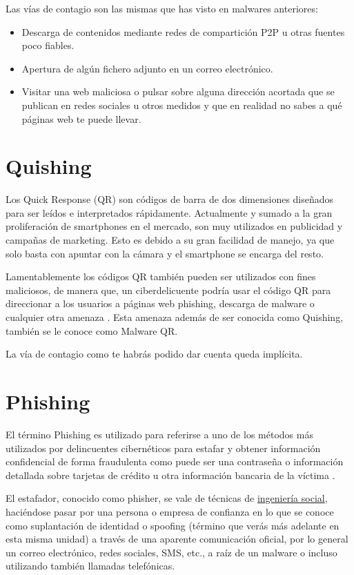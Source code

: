 \documentclass[
  spanish,
  a4paper,
  openany]{book}
\begin{document}
Las vías de contagio son las mismas que has visto en malwares anteriores:

\begin{itemize}
\item
  Descarga de contenidos mediante redes de compartición P2P u otras fuentes poco fiables.
\item
  Apertura de algún fichero adjunto en un correo electrónico.
\item
  Visitar una web maliciosa o pulsar sobre alguna dirección acortada que se publican en redes sociales u otros medidos y que en realidad no sabes a qué páginas web te puede llevar.
\end{itemize}

\hypertarget{quishing}{%
\section{Quishing}\label{quishing}}

Los Quick Response (QR) son códigos de barra de dos dimensiones diseñados para ser leídos e interpretados rápidamente. Actualmente y sumado a la gran proliferación de smartphones en el mercado, son muy utilizados en publicidad y campañas de marketing. Esto es debido a su gran facilidad de manejo, ya que solo basta con apuntar con la cámara y el smartphone se encarga del resto.

Lamentablemente los códigos QR también pueden ser utilizados con fines maliciosos, de manera que, un ciberdelicuente podría usar el código QR para direccionar a los usuarios a páginas web phishing, descarga de malware o cualquier otra amenaza \citep{ESET-malware-qr}. Esta amenaza además de ser conocida como Quishing, también se le conoce como Malware QR.

La vía de contagio como te habrás podido dar cuenta queda implícita.

\hypertarget{phishing}{%
\section{Phishing}\label{phishing}}

El término Phishing es utilizado para referirse a uno de los métodos más utilizados por delincuentes cibernéticos para estafar y obtener información confidencial de forma fraudulenta como puede ser una contraseña o información detallada sobre tarjetas de crédito u otra información bancaria de la víctima \citep{INFOSPY-phishing}.

El estafador, conocido como phisher, se vale de técnicas de \href{https://es.wikipedia.org/wiki/Ingeniería_social_(seguridad_informática)}{ingeniería social}, haciéndose pasar por una persona o empresa de confianza en lo que se conoce como suplantación de identidad o spoofing (término que verás más adelante en esta misma unidad) a través de una aparente comunicación oficial, por lo general un correo electrónico, redes sociales, SMS, etc., a raíz de un malware o incluso utilizando también llamadas telefónicas.
\end{document}
